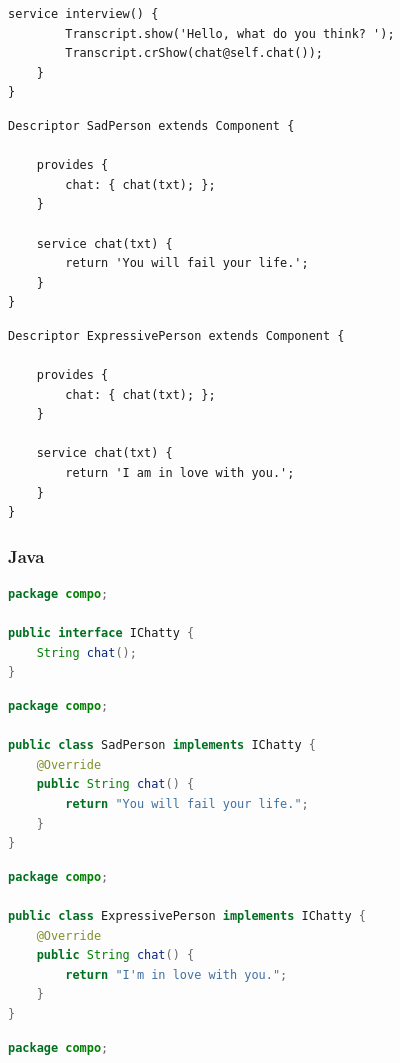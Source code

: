 \documentclass[11pt,a4paper,openany,oneside]{book}
\begin{document}
\begin{appendices}
\begin{lstlisting}[language=Compo, frame=single, caption=Interviewer]
    service interview() {
        Transcript.show('Hello, what do you think? ');
        Transcript.crShow(chat@self.chat());
    }
}
\end{lstlisting}

\begin{lstlisting}[language=Compo, frame=single, caption=SadPerson]
Descriptor SadPerson extends Component {

    provides {
        chat: { chat(txt); };
    }
    
    service chat(txt) {
        return 'You will fail your life.';
    }
}
\end{lstlisting}

\begin{lstlisting}[language=Compo, frame=single, caption=ExpressivePerson]
Descriptor ExpressivePerson extends Component {

    provides {
        chat: { chat(txt); };
    }
    
    service chat(txt) {
        return 'I am in love with you.';
    }
}
\end{lstlisting}


\clearpage

\subsubsection{Java}

\begin{lstlisting}[language=Java, frame=single, caption=IChatty]
package compo;

public interface IChatty {
    String chat();
}
\end{lstlisting}

\begin{lstlisting}[language=Java, frame=single, caption=SadPerson]
package compo;

public class SadPerson implements IChatty {
    @Override
    public String chat() {
        return "You will fail your life.";
    }
}
\end{lstlisting}

\begin{lstlisting}[language=Java, frame=single, caption=ExpressivePerson]
package compo;

public class ExpressivePerson implements IChatty {
    @Override
    public String chat() {
        return "I'm in love with you.";
    }
}
\end{lstlisting}

\begin{lstlisting}[language=Java, frame=single, caption=ChattyPointer]
package compo;


\end{lstlisting}
\end{appendices}
\end{document}
